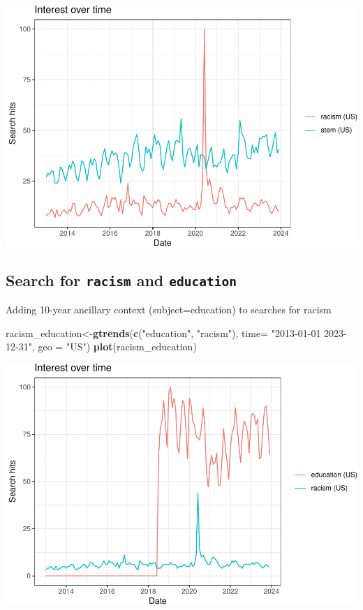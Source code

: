 \documentclass[
]{article}
\newenvironment{Shaded}{\begin{snugshade}}{\end{snugshade}}
\newcommand{\AttributeTok}[1]{\textcolor[rgb]{0.13,0.29,0.53}{#1}}
\newcommand{\FunctionTok}[1]{\textcolor[rgb]{0.13,0.29,0.53}{\textbf{#1}}}
\newcommand{\NormalTok}[1]{#1}
\newcommand{\OtherTok}[1]{\textcolor[rgb]{0.56,0.35,0.01}{#1}}
\newcommand{\StringTok}[1]{\textcolor[rgb]{0.31,0.60,0.02}{#1}}
\begin{document}
\includegraphics{overview-keyword-racism_files/figure-latex/unnamed-chunk-5-1.pdf}

\hypertarget{search-for-racism-and-education}{%
\subsection{\texorpdfstring{Search for \texttt{racism} and
\texttt{education}}{Search for racism and education}}\label{search-for-racism-and-education}}

Adding 10-year ancillary context (subject=education) to searches for
racism

\begin{Shaded}
\begin{Highlighting}[]
\NormalTok{racism\_education}\OtherTok{\textless{}{-}}\FunctionTok{gtrends}\NormalTok{(}\FunctionTok{c}\NormalTok{(}\StringTok{"education"}\NormalTok{, }\StringTok{"racism"}\NormalTok{), }\AttributeTok{time=} \StringTok{"2013{-}01{-}01 2023{-}12{-}31"}\NormalTok{, }\AttributeTok{geo =} \StringTok{"US"}\NormalTok{)}
\FunctionTok{plot}\NormalTok{(racism\_education)}
\end{Highlighting}
\end{Shaded}

\includegraphics{overview-keyword-racism_files/figure-latex/unnamed-chunk-6-1.pdf}
\end{document}
